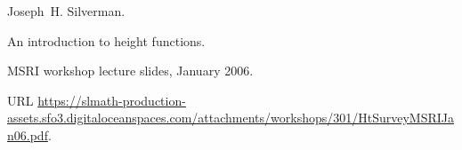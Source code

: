 Joseph~H. Silverman.

\newblock An introduction to height functions.

\newblock MSRI workshop lecture slides, January 2006.

\newblock URL
  \url{https://slmath-production-assets.sfo3.digitaloceanspaces.com/attachments/workshops/301/HtSurveyMSRIJan06.pdf}.

